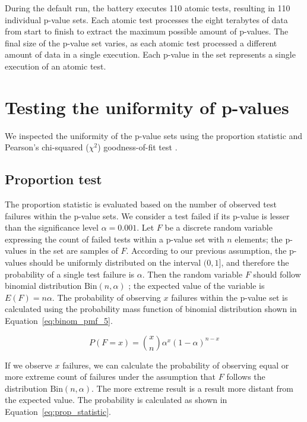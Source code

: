 \documentclass[
	digital,    %
	oneside,    %
	color,
	11pt,
	nocover,
	notable,
	nolof,
	nolot,
]{fithesis3}
\theoremstyle{definition}
\theoremstyle{remark}
\begin{document}
During the default run, the battery executes 110 atomic tests, resulting in 110 individual p-value sets. Each atomic test processes the eight terabytes of data from start to finish to extract the maximum possible amount of p-values. The final size of the p-value set varies, as each atomic test processed a different amount of data in a single execution. Each p-value in the set represents a single execution of an atomic test.

\section{Testing the uniformity of p-values}
\label{sec:testing_uniformity_dh}
We inspected the uniformity of the p-value sets using the proportion statistic and Pearson's chi-squared ($\chi^2$) goodness-of-fit test \cite[p.~219]{stat-handbook}.

\subsection{Proportion test}
The proportion statistic is evaluated based on the number of observed test failures within the p-value sets. We consider a test failed if its p-value is lesser than the significance level $\alpha=0.001$. Let $F$ be a discrete random variable expressing the count of failed tests within a p-value set with $n$ elements; the p-values in the set are samples of $F$. According to our previous assumption, the p-values should be uniformly distributed on the interval $(0,1]$, and therefore the probability of a single test failure is $\alpha$. Then the random variable $F$ should follow binomial distribution $\text{Bin}(n,\alpha)$ \cite[p.~245]{stat-handbook}; the expected value of the variable is $E(F) = n\alpha$. The probability of observing $x$ failures within the p-value set is calculated using the probability mass function of binomial distribution shown in Equation~\ref{eq:binom_pmf_5}.

\begin{equation}
\label{eq:binom_pmf_5}
P(F = x) = \binom xn \alpha^x(1-\alpha)^{n-x}
\end{equation}

If we observe $x$ failures, we can calculate the probability of observing equal or more extreme count of failures under the assumption that $F$ follows the distribution $\text{Bin}(n,\alpha)$. The more extreme result is a result more distant from the expected value. The probability is calculated as shown in Equation~\ref{eq:prop_statistic}.
\end{document}
